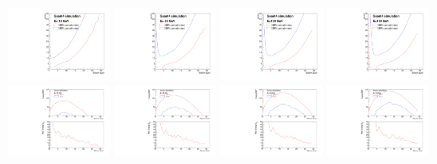 \begin{figure}[h!]
  \begin{center}
    \includegraphics[width=0.24\textwidth]{figures/cmolsensorenhitsvsrE10}
    \includegraphics[width=0.24\textwidth]{figures/cmolsensorenhitsvsrE50}
    \includegraphics[width=0.24\textwidth]{figures/cmolsensorenhitsvsrE100}
    \includegraphics[width=0.24\textwidth]{figures/cmolsensorenhitsvsrE150}
    \includegraphics[width=0.24\textwidth]{figures/cdynrangesensorenhitsvsrE10}
    \includegraphics[width=0.24\textwidth]{figures/cdynrangesensorenhitsvsrE50}
    \includegraphics[width=0.24\textwidth]{figures/cdynrangesensorenhitsvsrE100}
    \includegraphics[width=0.24\textwidth]{figures/cdynrangesensorenhitsvsrE150}

\end{center}
\end{figure}
